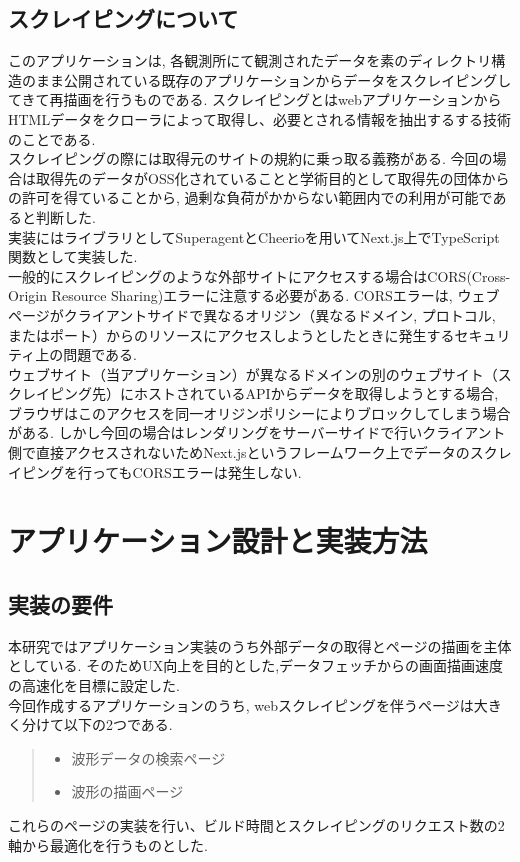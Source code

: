 \subsection{スクレイピングについて}
このアプリケーションは, 各観測所にて観測されたデータを素のディレクトリ構造のまま公開されている既存のアプリケーションからデータをスクレイピングしてきて再描画を行うものである.
スクレイピングとはwebアプリケーションからHTMLデータをクローラによって取得し、必要とされる情報を抽出するする技術のことである.\\
スクレイピングの際には取得元のサイトの規約に乗っ取る義務がある.
今回の場合は取得先のデータがOSS化されていることと学術目的として取得先の団体からの許可を得ていることから, 過剰な負荷がかからない範囲内での利用が可能であると判断した.\\
実装にはライブラリとしてSuperagentとCheerioを用いてNext.js上でTypeScript関数として実装した.\\
一般的にスクレイピングのような外部サイトにアクセスする場合はCORS(Cross-Origin Resource Sharing)エラーに注意する必要がある.
CORSエラーは, ウェブページがクライアントサイドで異なるオリジン（異なるドメイン, プロトコル, またはポート）からのリソースにアクセスしようとしたときに発生するセキュリティ上の問題である.\\
ウェブサイト（当アプリケーション）が異なるドメインの別のウェブサイト（スクレイピング先）にホストされているAPIからデータを取得しようとする場合, ブラウザはこのアクセスを同一オリジンポリシーによりブロックしてしまう場合がある.
しかし今回の場合はレンダリングをサーバーサイドで行いクライアント側で直接アクセスされないためNext.jsというフレームワーク上でデータのスクレイピングを行ってもCORSエラーは発生しない.

\section{アプリケーション設計と実装方法}
\subsection{実装の要件}
本研究ではアプリケーション実装のうち外部データの取得とページの描画を主体としている.
そのためUX向上を目的とした,データフェッチからの画面描画速度の高速化を目標に設定した.\\
今回作成するアプリケーションのうち, webスクレイピングを伴うページは大きく分けて以下の2つである.\\
\begin{quote}
	\begin{itemize}
		\item 波形データの検索ページ
		\item 波形の描画ページ
	\end{itemize}
\end{quote}
これらのページの実装を行い、ビルド時間とスクレイピングのリクエスト数の2軸から最適化を行うものとした.

